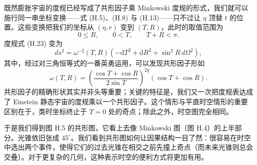 既然膨胀宇宙的度规已经写成了共形因子乘 Minkowski 度规的形式，我们就可以施行同一串坐标变换——式 (H.5)、(H.8) 与 (H.13)——只不过让 $\eta$ 顶替 $t$ 的位置。这些变换把我们的坐标从 $(\eta, r)$ 变到 $(T, R)$，此时的取值范围为
\begin{equation*}
0 \le R, \qquad 0 < T, \qquad T + R < \pi.
\tag{H.25}
\end{equation*}
度规式 (H.23) 变为
\begin{equation*}
ds^{2} = \omega^{-2}(T,R)\left(-\mathrm{d}T^{2} + \mathrm{d}R^{2} + \sin^{2}R\,d\Omega^{2}\right),
\tag{H.26}
\end{equation*}
其中，经过对三角恒等式的一番英勇运用，可以发现共形因子形如
\begin{equation*}
\omega(T,R) = \left(\frac{\cos T + \cos R}{2\sin T}\right)^{2q}(\cos T + \cos R).
\tag{H.27}
\end{equation*}
共形因子的精确形状其实并非头等重要；关键的特征是，我们又一次把度规表达成了 Einstein 静态宇宙的度规乘以一个共形因子。这个情形与平直时空情形的重要区别在于，类时坐标终止于 $T = 0$ 处的奇点；除此之外，时空图完全相同。

于是我们得到图 H.5 的共形图，它看上去像 Minkowski 图（图 H.4）的上半部分。光锥依旧张成 $45^{\circ}$。我们看到共形图如何让因果结构一目了然：很容易在时空中选出两个事件，使得它们的过去光锥在相交之前先撞上奇点（而未来光锥则总会交叠）。对于更复杂的几何，这种表示时空的便利方式将更加有用。

